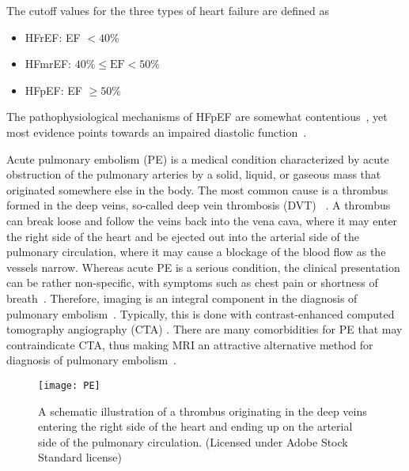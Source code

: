 The cutoff values for the three types of heart failure are defined as
\begin{itemize}
    \item HFrEF: EF $<40\% $
    \item HFmrEF: $40\% \leq \textrm{EF} < 50\% $
    \item HFpEF: EF $\geq 50\% $
\end{itemize}
The pathophysiological mechanisms of HFpEF are somewhat contentious~\cite{Pfeffer2019}, yet most evidence points towards an impaired diastolic function~\cite{Nagueh2019}.

Acute pulmonary embolism (PE)  is a medical condition characterized by acute obstruction of the pulmonary arteries by a solid, liquid, or gaseous mass that originated somewhere else in the body. The most common cause is a thrombus formed in the deep veins, so-called deep vein thrombosis (DVT) ~\cite{Goldhaber2012}. A thrombus can break loose and follow the veins back into the vena cava, where it may enter the right side of the heart and be ejected out into the arterial side of the pulmonary circulation, where it may cause a blockage of the blood flow as the vessels narrow. Whereas acute PE is a serious condition, the clinical presentation can be rather non-specific, with symptoms such as chest pain or shortness of breath~\cite{Hampson1995}. Therefore, imaging is an integral component in the diagnosis of pulmonary embolism~\cite{Bounameaux2010}. Typically, this is done with contrast-enhanced computed tomography angiography (CTA) . There are many comorbidities for PE that may contraindicate CTA, thus making MRI an attractive alternative method for diagnosis of pulmonary embolism~\cite{Stein2011}. 
\begin{figure}[hbt]
\centering
\texttt{[image: PE]}
\caption{A schematic illustration of a thrombus originating in the deep veins entering the right side of the heart and ending up on the arterial side of the pulmonary circulation. (Licensed under Adobe Stock Standard license)}
\label{fig:pe}
\end{figure}
